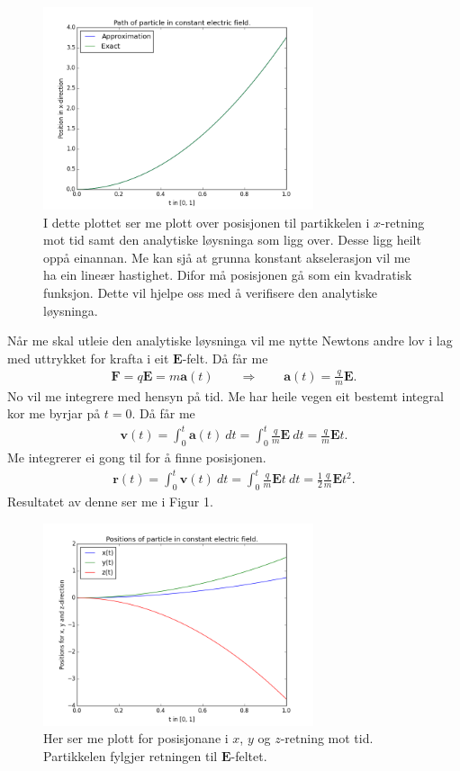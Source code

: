 \documentclass[11pt, a4paper]{article}
\begin{document}
  \begin{figure}[H]
    \centering
    \includegraphics[width=300px]{A.png}
    \caption{I dette plottet ser me plott over posisjonen til partikkelen i $x$-retning mot 
    tid samt den analytiske løysninga som ligg over. Desse ligg heilt oppå einannan.
    Me kan sjå at grunna konstant akselerasjon vil me ha ein lineær hastighet. Difor må 
    posisjonen gå som ein kvadratisk funksjon. Dette vil hjelpe oss med å verifisere den 
    analytiske løysninga.}
  \end{figure}
  Når me skal utleie den analytiske løysninga vil me nytte Newtons andre lov i lag med uttrykket for krafta i eit $\mathbf{E}$-felt. Då får me
  \begin{align*}
    \mathbf{F} = q\mathbf{E} = m\mathbf{a}(t) \qquad \Rightarrow \qquad \mathbf{a}(t) = \frac{q}{m}\mathbf{E}.
  \end{align*}
  No vil me integrere med hensyn på tid. Me har heile vegen eit bestemt integral kor me byrjar på $t = 0$. Då får me
  \begin{align*}
    \mathbf{v}(t) = \int_0^t\mathbf{a}(t) \ dt = \int_0^t \frac{q}{m}\mathbf{E} \ dt = \frac{q}{m}\mathbf{E}t.
  \end{align*}
  Me integrerer ei gong til for å finne posisjonen.
  \begin{align*}
    \mathbf{r}(t) = \int_0^t\mathbf{v}(t) \ dt = \int_0^t \frac{q}{m}\mathbf{E}t \ dt = \frac{1}{2}\frac{q}{m}\mathbf{E}t^2.
  \end{align*}
  Resultatet av denne ser me i Figur 1.

  \begin{figure}[H]
    \centering
    \includegraphics[width=300px]{C1.png}
    \caption{Her ser me plott for posisjonane i $x$, $y$ og $z$-retning mot tid. Partikkelen fylgjer retningen til $\mathbf{E}$-feltet.}
  \end{figure}
\end{document}
